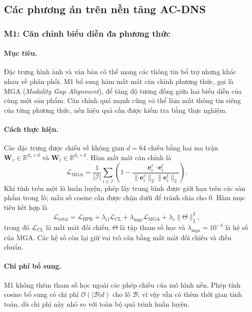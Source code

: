 \subsection{Các phương án trên nền tảng AC-DNS}
\label{sec:negcl_advanced_methods}


\subsubsection{M1: Căn chỉnh biểu diễn đa phương thức}

\paragraph{Mục tiêu.}
Đặc trưng hình ảnh và văn bản có thể mang các thông tin bổ trợ nhưng khác nhau về phân phối. M1 bổ sung hàm mất mát căn chỉnh phương thức, gọi là MGA (\textit{Modality Gap Alignment}), để tăng độ tương đồng giữa hai biểu diễn của cùng một sản phẩm. Căn chỉnh quá mạnh cũng có thể làm mất thông tin riêng của từng phương thức, nên hiệu quả cần được kiểm tra bằng thực nghiệm.

\paragraph{Cách thực hiện.}
Các đặc trưng được chiếu về không gian $d=64$ chiều bằng hai ma trận $\mathbf W_v\in\mathbb R^{d_v\times d}$ và $\mathbf W_t\in\mathbb R^{d_t\times d}$. Hàm mất mát căn chỉnh là
\begin{equation}
\mathcal{L}_{\text{MGA}} = \frac{1}{|\mathcal{I}|} \sum_{i \in \mathcal{I}}
\left(1-\frac{\mathbf e_i^v\cdot\mathbf e_i^t}{\|\mathbf e_i^v\|_2\|\mathbf e_i^t\|_2}\right).
\label{eq:mga_loss}
\end{equation}
Khi tính trên một lô huấn luyện, phép lấy trung bình được giới hạn trên các sản phẩm trong lô; mẫu số cosine cần được chặn dưới để tránh chia cho $0$. Hàm mục tiêu kết hợp là
\begin{equation}
\mathcal{L}_{\text{total}} = \mathcal{L}_{\text{BPR}} + \lambda_{\text{cl}}\mathcal{L}_{\text{CL}}
+ \lambda_{\text{mga}}\mathcal{L}_{\text{MGA}} + \lambda_r\|\Theta\|_2^2,
\label{eq:mga_total_loss}
\end{equation}
trong đó $\mathcal L_{\text{CL}}$ là mất mát đối chiếu, $\Theta$ là tập tham số học và $\lambda_{\text{mga}}=10^{-4}$ là hệ số của MGA. Các hệ số còn lại giữ vai trò cân bằng mất mát đối chiếu và điều chuẩn.

\paragraph{Chi phí bổ sung.}
M1 không thêm tham số học ngoài các phép chiếu của mô hình nền. Phép tính cosine bổ sung có chi phí $\mathcal O(|\mathcal B|d)$ cho lô $\mathcal B$; vì vậy vẫn có thêm thời gian tính toán, dù chi phí này nhỏ so với toàn bộ quá trình huấn luyện.

